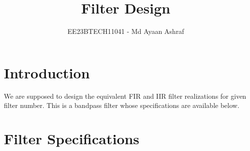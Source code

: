 \documentclass[journal,12pt,twocolumn]{IEEEtran}
\theoremstyle{remark}
\begin{document}

\vspace{3cm}
\title{Filter Design}
\author{EE23BTECH11041 - Md Ayaan Ashraf}
\maketitle
\newpage
\bigskip
\renewcommand{\thefigure}{\arabic{figure}}

\section{\textbf{Introduction}}
We are supposed to design the equivalent FIR and IIR filter realizations for given filter number.  
This is a bandpass filter whose specifications are available below.
\section{\textbf{Filter Specifications}}
\end{document}
